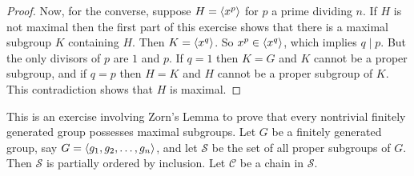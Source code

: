 \begin{enumerate}
\begin{proof}
    Now, for the converse, suppose $H = \langle{x^p}\rangle$ for $p$ a prime
    dividing $n$. If $H$ is not maximal then the first part of this
    exercise shows that there is a maximal subgroup $K$ containing
    $H$. Then $K = \langle{x^q}\rangle$. So $x^p\in\langle{x^q}\rangle$, which implies
    $q\mid p$. But the only divisors of $p$ are $1$ and $p$. If
    $q = 1$ then $K = G$ and $K$ cannot be a proper subgroup, and if
    $q = p$ then $H = K$ and $H$ cannot be a proper subgroup of
    $K$. This contradiction shows that $H$ is maximal.
  \end{proof}
\end{enumerate}

 This is an exercise involving Zorn's Lemma to prove that
every nontrivial finitely generated group possesses maximal
subgroups. Let $G$ be a finitely generated group, say
$G = \langle{g_1,g_2,\dots,g_n}\rangle$, and let $\mathcal{S}$ be the set of all
proper subgroups of $G$. Then $\mathcal{S}$ is partially ordered by
inclusion. Let $\mathcal{C}$ be a chain in $\mathcal{S}$.
